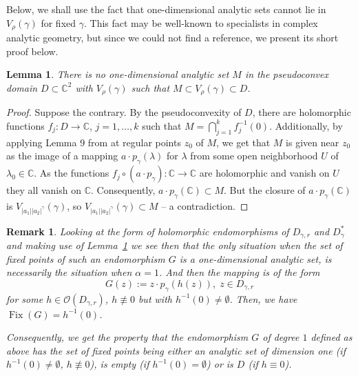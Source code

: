 \documentclass[a4paper,12pt]{amsart}
\DeclareMathOperator{\Fix}{Fix}
\newtheorem{lemma}[theorem]{Lemma}
\newtheorem{remark}[theorem]{Remark}
\theoremstyle{definition}
\begin{document}
Below, we shall use the fact that one-dimensional analytic sets cannot lie in $V_{\rho}(\gamma)$ for fixed $\gamma$. This fact may be well-known to specialists in complex analytic geometry, but since we could not find a reference, we present its short proof below.

\begin{lemma}\label{lemma:one-dimensional-analytic-set}
    There is no one-dimensional analytic set $M$ in the pseudoconvex domain $D\subset\mathbb C^2$ with $V_{\rho}(\gamma)$ such that $M\subset V_{\rho}(\gamma)\subset D$.
\end{lemma}
\begin{proof}
    Suppose the contrary. By the pseudoconvexity of $D$, there are holomorphic functions $f_j \colon D\to\mathbb C$, $j=1,\ldots,k$ such that $M=\bigcap\limits_{j=1}^k f_j^{-1}(0)$. Additionally, by applying Lemma 9 from \cite{05208635} at regular points $z_0$ of $M$, we get that $M$ is given near $z_0$ as the image of a mapping $a\cdot p_{\gamma}(\lambda)$ for $\lambda$ from some open neighborhood $U$ of $\lambda_0\in\mathbb C$. As the functions $f_j\circ(a\cdot p_{\gamma}):\mathbb C\to\mathbb C$ are holomorphic and vanish on $U$ they all vanish on $\mathbb C$. Consequently, $a\cdot p_{\gamma}(\mathbb C)\subset M$. But the closure of $a\cdot p_{\gamma}(\mathbb C)$ is $V_{|a_1||a_2|^{\gamma}}(\gamma)$, so $V_{|a_1||a_2|^{\gamma}}(\gamma)\subset M$ -- a contradiction.   
\end{proof}

\begin{remark}\label{remark:fixed-points-analytic-set} Looking at the form of holomorphic endomorphisms of $D_{\gamma,r}$ and $D_{\gamma}^*$ and making use of Lemma~\ref{lemma:one-dimensional-analytic-set} we see then that the only situation when the set of fixed points of such an endomorphism $G$ is a one-dimensional analytic set, is necessarily the situation when $\alpha=1$. And then the mapping is of the form
\begin{equation}
G(z):=z\cdot p_{\gamma}(h(z)),\; z\in D_{\gamma,r}
\end{equation}
for some $h\in\mathcal O(D_{\gamma,r})$, $h\not\equiv 0$ but with $h^{-1}(0)\neq \emptyset$. Then, we have $\Fix (G)=h^{-1}(0)$. 

Consequently, we get the property that the endomorphism $G$ of degree $1$ defined as above has the set of fixed points being either an analytic set of dimension one (if $h^{-1}(0)\neq\emptyset$, $h\not\equiv 0$), is empty (if $h^{-1}(0)=\emptyset$) or is $D$ (if $h\equiv 0$). 
\end{remark}
\end{document}
